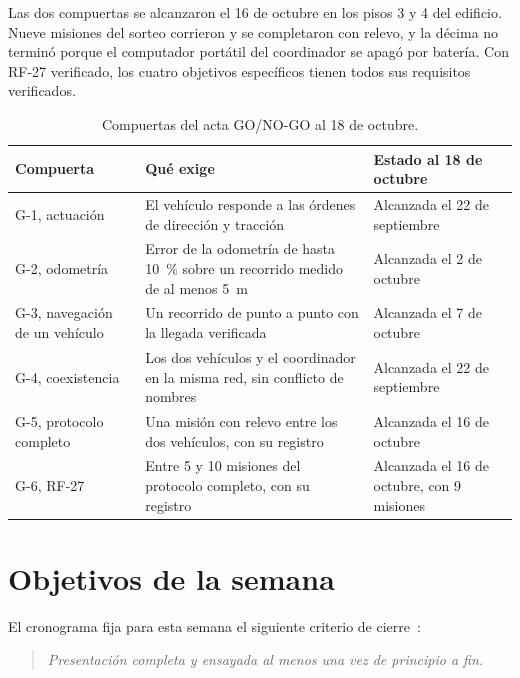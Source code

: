 \documentclass[12pt,letterpaper]{article}
\begin{document}
Las dos compuertas se alcanzaron el 16 de octubre en los pisos 3 y 4 del edificio. Nueve misiones del sorteo corrieron y se completaron con relevo, y la décima no terminó porque el computador portátil del coordinador se apagó por batería. Con RF-27 verificado, los cuatro objetivos específicos tienen todos sus requisitos verificados.

\begin{table}[H]
    \centering
    \small
    \caption{Compuertas del acta GO/NO-GO al 18 de octubre.}
    \label{tab:compuertas}
    \begin{tabular}{@{}p{4.2cm}p{3.6cm}p{6.2cm}@{}}
        \toprule
        \textbf{Compuerta} & \textbf{Qué exige} & \textbf{Estado al 18 de octubre} \\ \midrule
        G-1, actuación & El vehículo responde a las órdenes de dirección y tracción & Alcanzada el 22 de septiembre \\ \addlinespace
        G-2, odometría & Error de la odometría de hasta 10~\% sobre un recorrido medido de al menos 5~m & Alcanzada el 2 de octubre \\ \addlinespace
        G-3, navegación de un vehículo & Un recorrido de punto a punto con la llegada verificada & Alcanzada el 7 de octubre \\ \addlinespace
        G-4, coexistencia & Los dos vehículos y el coordinador en la misma red, sin conflicto de nombres & Alcanzada el 22 de septiembre \\ \addlinespace
        G-5, protocolo completo & Una misión con relevo entre los dos vehículos, con su registro & Alcanzada el 16 de octubre \\ \addlinespace
        G-6, RF-27 & Entre 5 y 10 misiones del protocolo completo, con su registro & Alcanzada el 16 de octubre, con 9 misiones \\ \bottomrule
    \end{tabular}
\end{table}

\section{Objetivos de la semana}

El cronograma fija para esta semana el siguiente criterio de cierre~\cite{cronograma,plan}:

\begin{quote}
\textit{Presentación completa y ensayada al menos una vez de principio a fin.}
\end{quote}
\end{document}
